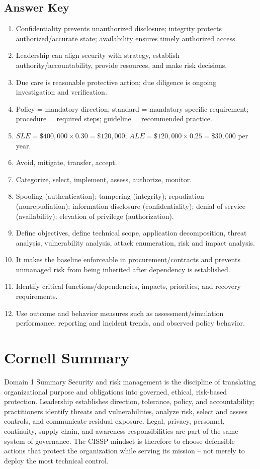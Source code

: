 \documentclass[10pt,letterpaper]{article}
\begin{document}
\subsection*{Answer Key}
\begin{enumerate}
\item Confidentiality prevents unauthorized disclosure; integrity protects authorized/accurate state; availability ensures timely authorized access.
\item Leadership can align security with strategy, establish authority/accountability, provide resources, and make risk decisions.
\item Due care is reasonable protective action; due diligence is ongoing investigation and verification.
\item Policy = mandatory direction; standard = mandatory specific requirement; procedure = required steps; guideline = recommended practice.
\item \(SLE=\$400{,}000\times0.30=\$120{,}000\); \(ALE=\$120{,}000\times0.25=\$30{,}000\) per year.
\item Avoid, mitigate, transfer, accept.
\item Categorize, select, implement, assess, authorize, monitor.
\item Spoofing (authentication); tampering (integrity); repudiation (nonrepudiation); information disclosure (confidentiality); denial of service (availability); elevation of privilege (authorization).
\item Define objectives, define technical scope, application decomposition, threat analysis, vulnerability analysis, attack enumeration, risk and impact analysis.
\item It makes the baseline enforceable in procurement/contracts and prevents unmanaged risk from being inherited after dependency is established.
\item Identify critical functions/dependencies, impacts, priorities, and recovery requirements.
\item Use outcome and behavior measures such as assessment/simulation performance, reporting and incident trends, and observed policy behavior.
\end{enumerate}

\section{Cornell Summary}
\begin{summarybox}{Domain 1 Summary}
Security and risk management is the discipline of translating organizational purpose and obligations into governed, ethical, risk-based protection. Leadership establishes direction, tolerance, policy, and accountability; practitioners identify threats and vulnerabilities, analyze risk, select and assess controls, and communicate residual exposure. Legal, privacy, personnel, continuity, supply-chain, and awareness responsibilities are part of the same system of governance. The CISSP mindset is therefore to choose defensible actions that protect the organization while serving its mission -- not merely to deploy the most technical control.
\end{summarybox}
\end{document}
